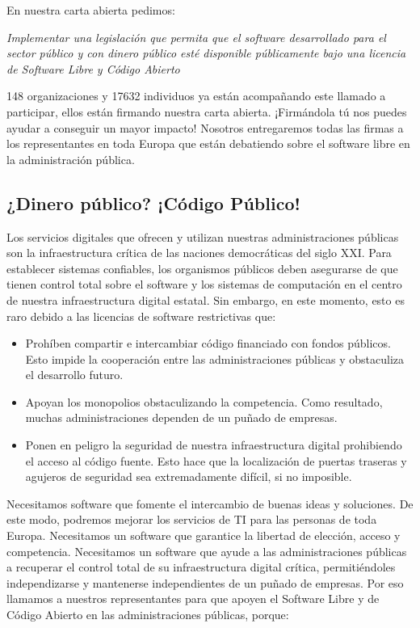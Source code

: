 \documentclass[10pt,foldmark,tumble]{leaflet}
\begin{document}
En nuestra carta abierta pedimos:

\textit{Implementar una legislación que permita que el software desarrollado para el sector público y con dinero público esté disponible públicamente bajo una licencia de Software Libre y Código Abierto}

148 organizaciones y 17632 individuos ya están acompañando este llamado a participar, ellos están firmando nuestra carta abierta. ¡Firmándola tú nos puedes ayudar a conseguir un mayor impacto! Nosotros entregaremos todas las firmas a los representantes en toda Europa que están debatiendo sobre el software libre en la administración pública.

\vspace{1em}
  \subsection{ ¿Dinero público? ¡Código Público!}
\vspace{.5em}

    Los servicios digitales que ofrecen y utilizan nuestras administraciones públicas son la infraestructura crítica de las naciones democráticas del siglo XXI. Para establecer sistemas confiables, los organismos públicos deben asegurarse de que tienen control total sobre el software y los sistemas de computación en el centro de nuestra infraestructura digital estatal. Sin embargo, en este momento, esto es raro debido a las licencias de software restrictivas que:

\begin{itemize}
    \item Prohíben compartir e intercambiar código financiado con fondos públicos. Esto impide la cooperación entre las administraciones públicas y obstaculiza el desarrollo futuro.
    \item Apoyan los monopolios obstaculizando la competencia. Como resultado, muchas administraciones dependen de un puñado de empresas.
    \item Ponen en peligro la seguridad de nuestra infraestructura digital prohibiendo el acceso al código fuente. Esto hace que la localización de puertas traseras y agujeros de seguridad sea extremadamente difícil, si no imposible.
\end{itemize}

    Necesitamos software que fomente el intercambio de buenas ideas y soluciones. De este modo, podremos mejorar los servicios de TI para las personas de toda Europa. Necesitamos un software que garantice la libertad de elección, acceso y competencia. Necesitamos un software que ayude a las administraciones públicas a recuperar el control total de su infraestructura digital crítica, permitiéndoles independizarse y mantenerse independientes de un puñado de empresas. Por eso llamamos a nuestros representantes para que apoyen el Software Libre y de Código Abierto en las administraciones públicas, porque:
\end{document}
